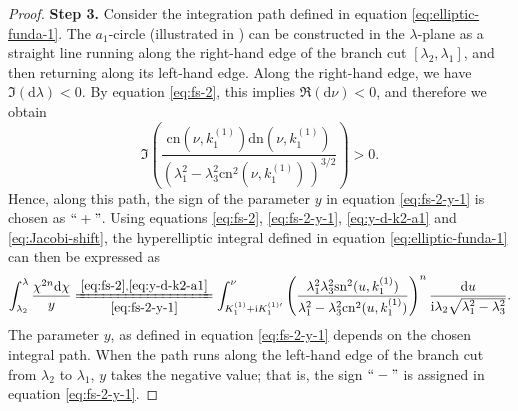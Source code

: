 \documentclass[11pt,reqno]{amsart}
\newcommand{\ii}{\mathrm{i}}
\newcommand{\sn}{\mathrm{sn}}
\newcommand{\cn}{\mathrm{cn}}
\newcommand{\dn}{\mathrm{dn}}
\newcommand{\dd}{\mathrm{d}}
\numberwithin{equation}{section}
\begin{document}
\begin{proof}
	\textbf{Step 3.}
	Consider the integration path defined in equation \eqref{eq:elliptic-funda-1}.
	The $a_1$-circle (illustrated in ) can be constructed in the $\lambda$-plane as a straight line running along the right-hand edge of the branch cut $[\lambda_2,\lambda_1]$, and then returning along its left-hand edge.
	Along the right-hand edge, we have $\Im(\dd \lambda)<0$. 
	By equation \eqref{eq:fs-2}, this implies $\Re(\dd \nu)<0$, and therefore we obtain
	\begin{equation}\label{eq:y-d-k2-a1}
		\Im\left(\frac{\cn(\nu,  k^{(1)}_1)\dn(\nu,  k^{(1)}_1)}{(\lambda_1^2-\lambda_3^2\cn^2(\nu,  k^{(1)}_1)\,)^{3/2}}\right)>0.
	\end{equation}
	Hence, along this path, the sign of the parameter $y$ in equation \eqref{eq:fs-2-y-1} is chosen as $``+"$.
	Using equations \eqref{eq:fs-2},  \eqref{eq:fs-2-y-1}, \eqref{eq:y-d-k2-a1} and \eqref{eq:Jacobi-shift}, the hyperelliptic integral defined in equation \eqref{eq:elliptic-funda-1} can then be expressed as 
	\begin{equation}\label{eq:elliptic-funda-1-ge}
		\int_{\lambda_2}^{\lambda} \frac{\chi^{2n}\dd \chi}{y}\xlongequal[\eqref{eq:fs-2-y-1}]{\eqref{eq:fs-2},\eqref{eq:y-d-k2-a1}}  \int_{K^{(1)}_1+\ii K^{(1)\prime}_1}^{\nu}\left(\frac{\lambda_1^2\lambda_3^2\sn^2(u,k^{(1)}_1)}{\lambda_1^2-\lambda_3^2\cn^2(u,k^{(1)}_1)}\right)^n\frac{\dd u}{\ii \lambda_2\sqrt{\lambda_1^2-\lambda_3^2}}.
	\end{equation}
	The parameter $y$, as defined in equation \eqref{eq:fs-2-y-1} depends on the chosen integral path.
	When the path runs along the left-hand edge of the branch cut from $\lambda_2$ to $\lambda_1$, $y$ takes the negative value; that is, the sign $``-"$ is assigned in equation \eqref{eq:fs-2-y-1}.
	

\end{proof}
\end{document}
